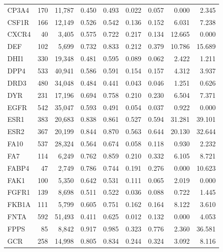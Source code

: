 \begin{center}
\begin{longtable}{@{}lrrrrrrrr@{}}
    CP3A4  & 170   & 11,787   & 0.450   & 0.493   & 0.022   & 0.057   & 0.000   & 2.345  \\
    CSF1R  & 166   & 12,149   & 0.526   & 0.542   & 0.136   & 0.152   & 6.031   & 7.238  \\
    CXCR4  & 40    & 3,405    & 0.575   & 0.722   & 0.217   & 0.134   & 12.665  & 0.000  \\
    DEF    & 102   & 5,699    & 0.732   & 0.833   & 0.212   & 0.379   & 10.786  & 15.689 \\
    DHI1   & 330   & 19,348   & 0.481   & 0.595   & 0.089   & 0.062   & 2.422   & 1.211  \\
    DPP4   & 533   & 40,941   & 0.586   & 0.591   & 0.154   & 0.157   & 4.312   & 3.937  \\
    DRD3   & 480   & 34,048   & 0.484   & 0.441   & 0.043   & 0.046   & 1.251   & 0.626  \\
    DYR    & 231   & 17,196   & 0.694   & 0.758   & 0.210   & 0.230   & 6.504   & 7.371  \\
    EGFR   & 542   & 35,047   & 0.593   & 0.491   & 0.054   & 0.037   & 0.922   & 0.000  \\
    ESR1   & 383   & 20,683   & 0.838   & 0.861   & 0.527   & 0.594   & 31.281  & 39.101 \\
    ESR2   & 367   & 20,199   & 0.844   & 0.870   & 0.563   & 0.644   & 20.130  & 32.644 \\
    FA10   & 537   & 28,324   & 0.564   & 0.674   & 0.058   & 0.118   & 0.930   & 2.232  \\
    FA7    & 114   & 6,249    & 0.762   & 0.859   & 0.210   & 0.332   & 6.105   & 8.721  \\
    FABP4  & 47    & 2,749    & 0.786   & 0.744   & 0.191   & 0.276   & 0.000   & 10.623 \\
    FAK1   & 100   & 5,350    & 0.642   & 0.531   & 0.111   & 0.065   & 2.019   & 0.000  \\
    FGFR1  & 139   & 8,698    & 0.511   & 0.522   & 0.036   & 0.088   & 0.722   & 1.445  \\
    FKB1A  & 111   & 5,799    & 0.605   & 0.751   & 0.162   & 0.164   & 8.122   & 3.610  \\
    FNTA   & 592   & 51,493   & 0.411   & 0.625   & 0.012   & 0.132   & 0.000   & 4.053  \\
    FPPS   & 85    & 8,842    & 0.917   & 0.985   & 0.323   & 0.776   & 2.360   & 36.581 \\
    GCR    & 258   & 14,998   & 0.805   & 0.834   & 0.244   & 0.324   & 3.092   & 8.116  \\

\end{longtable}
\end{center}
